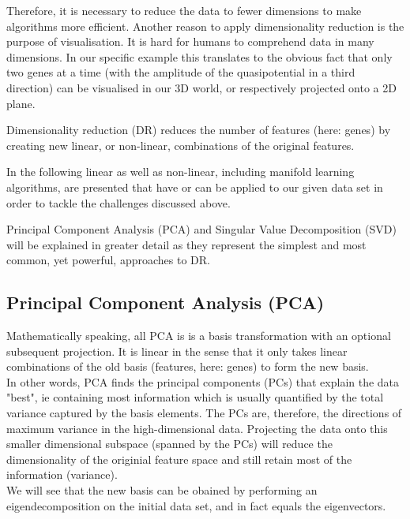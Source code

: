 \documentclass[journal, a4paper]{IEEEtran}
\begin{document}
Therefore, it is necessary to reduce the data to fewer dimensions to make algorithms more efficient. 
Another reason to apply dimensionality reduction is the purpose of visualisation. It is hard for humans to comprehend data in many dimensions. In our specific example this translates to the obvious fact that only two genes at a time (with the amplitude of the quasipotential in a third direction) can be visualised in our 3D world, or respectively projected onto a 2D plane. 

Dimensionality reduction (DR) reduces the number of features (here: genes) by creating new linear, or non-linear, combinations of the original features.


In the following linear as well as non-linear, including manifold learning algorithms, are presented that have or can be applied to our given data set in order to tackle the challenges discussed above.

Principal Component Analysis (PCA) and Singular Value Decomposition (SVD) will be explained in greater detail as they represent the simplest and most common, yet powerful, approaches to DR.


\subsection{Principal Component Analysis (PCA)}

Mathematically speaking, all PCA is is a basis transformation with an optional subsequent projection. It is linear in the sense that it only takes linear combinations of the old basis (features, here: genes) to form the new basis. \\

In other words, PCA finds the principal components (PCs) that explain the data "best", ie containing most information which is usually quantified by the total variance captured by the basis elements. The PCs are, therefore, the directions of maximum variance in the high-dimensional data. Projecting the data onto this smaller dimensional subspace (spanned by the PCs) will reduce the dimensionality of the originial feature space and still retain most of the information (variance). \\
We will see that the new basis can be obained by performing an eigendecomposition on the initial data set, and in fact equals the eigenvectors.
\end{document}
